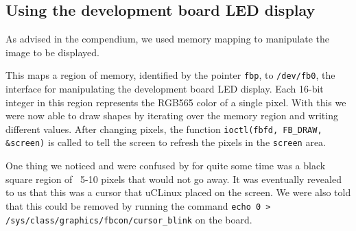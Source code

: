 \subsection{Using the development board LED display}
As advised in the compendium, we used memory mapping to manipulate the image to be displayed.



This maps a region of memory, identified by the pointer \texttt{fbp}, to \texttt{/dev/fb0}, the interface for manipulating the development board LED display.
Each 16-bit integer in this region represents the RGB565 color of a single pixel.
With this we were now able to draw shapes by iterating over the memory region and writing different values.
After changing pixels, the function \texttt{ioctl(fbfd, FB\_DRAW, \&screen)} is called to tell the screen to refresh the pixels in the \texttt{screen} area.

One thing we noticed and were confused by for quite some time was a black square region of ~5-10 pixels that would not go away.
It was eventually revealed to us that this was a cursor that uCLinux placed on the screen.
We were also told that this could be removed by running the command \texttt{echo 0 > /sys/class/graphics/fbcon/cursor\_blink} on the board.
